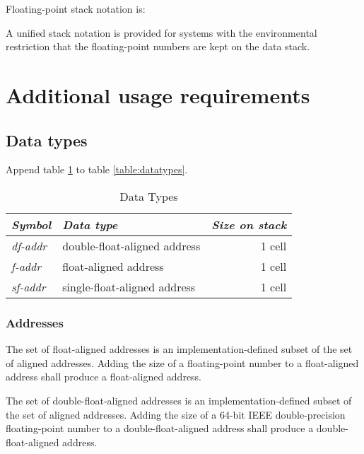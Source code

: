 Floating-point stack notation is:
\begin{quote}
\end{quote}

A unified stack notation is provided for systems with the environmental
restriction that the floating-point numbers are kept on the data stack.

\section{Additional usage requirements} %

\subsection{Data types} %
\label{float:datatypes}

Append table \ref{float:types} to table \ref{table:datatypes}.

\begin{table}[ht]
  \begin{center}
	\caption{Data Types}
	\label{float:types}
	\begin{tabular}{llr}
	\hline\hline
	\emph{Symbol} & \emph{Data type} & \emph{Size on stack} \\
	\hline
	\emph{df-addr}	& double-float-aligned address	& 1 cell \\
	\emph{f-addr}	& float-aligned address				& 1 cell \\
	\emph{sf-addr}	& single-float-aligned address	& 1 cell \\
	\hline\hline
	\end{tabular}
  \end{center}
\end{table}

\subsubsection{Addresses} %
\label{float:addr}

The set of float-aligned addresses is an implementation-defined
subset of the set of aligned addresses. Adding the size of a
floating-point number to a float-aligned address shall produce
a float-aligned address.

The set of double-float-aligned addresses is an implementation-defined
subset of the set of aligned addresses. Adding the size of a 64-bit
IEEE double-precision floating-point number to a double-float-aligned
address shall produce a double-float-aligned address.

